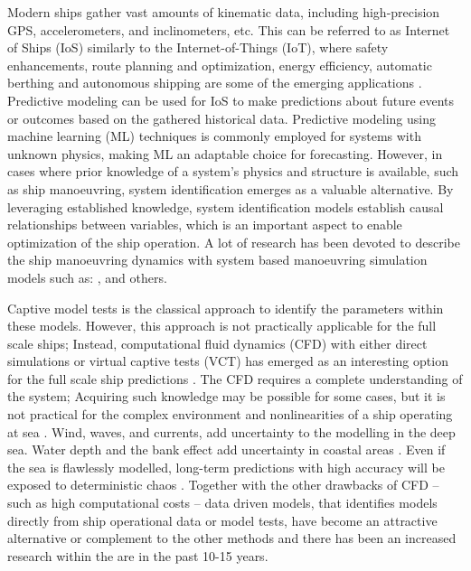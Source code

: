 Modern ships gather vast amounts of kinematic data, including high-precision GPS, accelerometers, and inclinometers, etc. This can be referred to as Internet of Ships (IoS) \citep{liu_internet_2016} similarly to the Internet-of-Things (IoT), where safety enhancements, route planning and optimization, energy efficiency, automatic berthing and autonomous shipping are some of the emerging applications \citep{aslam_internet_2020}.
Predictive modeling can be used for IoS to make predictions about future events or outcomes based on the gathered historical data.
Predictive modeling using machine learning (ML) techniques is commonly employed for systems with unknown physics, making ML an adaptable choice for forecasting. However, in cases where prior knowledge of a system's physics and structure is available, such as ship manoeuvring, system identification emerges as a valuable alternative. By leveraging established knowledge, system identification models establish causal relationships between variables, which is an important aspect to enable optimization of the ship operation.
A lot of research has been devoted to describe the ship manoeuvring dynamics with system based manoeuvring simulation models such as: \citet{abkowitz_ship_1964,nomoto_steering_1957,norrbin_theory_1971,yasukawa_introduction_2015}, and others.

Captive model tests is the classical approach to identify the parameters within these models. However, this approach is not practically applicable for the full scale ships; Instead, computational fluid dynamics (CFD) with either direct simulations or virtual captive tests (VCT) has emerged as an interesting option for the full scale ship predictions \citep{liu_predictions_2018,li_ship_2022}.
The CFD requires a complete understanding of the system; Acquiring such knowledge may be possible for some cases, but it is not practical for the complex environment and nonlinearities of a ship operating at sea \citep{miller_ship_2021}.
Wind, waves, and currents, add uncertainty to the modelling in the deep sea. Water depth and the bank effect add uncertainty in coastal areas \citep{nielsen_machine_2022}.
Even if the sea is flawlessly modelled, long-term predictions with high accuracy will be exposed to deterministic chaos \citep{lorenz_deterministic_1963}.
Together with the other drawbacks of CFD -- such as high computational costs -- data driven models, that identifies models directly from ship operational data or model tests, have become an attractive alternative or complement to the other methods and there has been an increased research within the are in the past 10-15 years.

